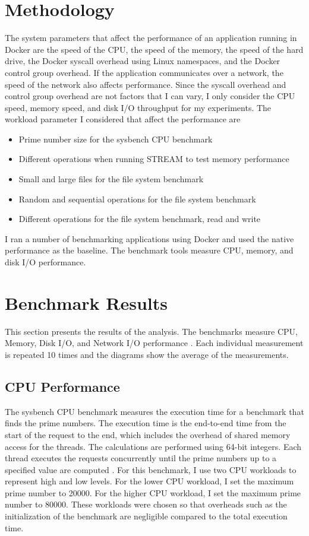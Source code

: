 \documentclass[11pt]{article}
\begin{document}
\section{Methodology}
The system parameters that affect the performance of an application running in Docker are the speed of the CPU, the speed of the memory, the speed of the hard drive, the Docker syscall overhead using Linux namespaces, and the Docker control group overhead. If the application communicates over a network, the speed of the network also affects performance. Since the syscall overhead and control group overhead are not factors that I can vary, I only consider the CPU speed, memory speed, and disk I/O throughput for my experiments. The workload parameter I considered that affect the performance are 
\begin{itemize}
\item Prime number size for the sysbench CPU benchmark
\item Different operations when running STREAM to test memory performance
\item Small and large files for the file system benchmark
\item Random and sequential operations for the file system benchmark
\item Different operations for the file system benchmark, read and write
\end{itemize}
I ran a number of benchmarking applications using Docker and used the native performance as the baseline. The benchmark tools measure CPU, memory, and disk I/O performance. 

\section{Benchmark Results}
This section presents the results of the analysis. The benchmarks measure CPU, Memory, Disk I/O, and Network I/O performance \cite{bukh}. Each individual measurement is repeated 10 
times and the diagrams show the average of the measurements. 

\subsection{CPU Performance}
The sysbench CPU benchmark measures the execution time for a benchmark that finds the prime numbers. The execution time is the end-to-end time from the start of the request to the end, which includes the overhead of shared memory access for the threads. The calculations are performed using 64-bit integers. Each thread executes the requests concurrently until the prime numbers up to a specified value are computed \cite{kopytov}. For this benchmark, I use two CPU workloads to represent high and low levels. For the lower CPU workload, I set the maximum prime number to 20000. For the higher CPU workload, I set the maximum prime number to 80000. These workloads were chosen so that overheads such as the initialization of the benchmark are negligible compared to the total execution time. 
\end{document}
